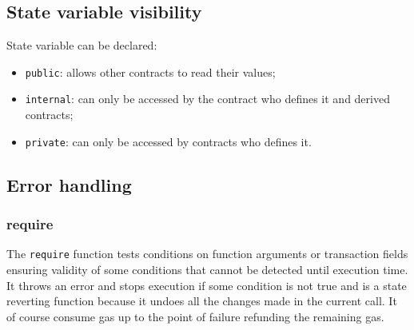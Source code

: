 \subsection{State variable visibility}
State variable can be declared:
\begin{itemize}
    \item \verb|public|: allows other contracts to read their values;
    \item \verb|internal|: can only be accessed by the contract who defines it and derived contracts;
    \item \verb|private|: can only be accessed by contracts who defines it.
\end{itemize}

\subsection{Error handling}
\subsubsection{require}
The \verb|require| function tests conditions on function arguments or transaction fields ensuring validity of some conditions that cannot be detected until execution time.
It throws an error and stops execution if some condition is not true and is a state reverting function because it undoes all the changes made in the current call.
It of course consume gas up to the point of failure refunding the remaining gas.

